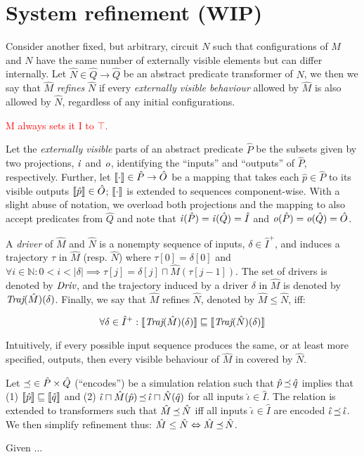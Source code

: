 \section{System refinement (WIP)}

Consider another fixed, but arbitrary, circuit $N$ such that configurations of $M$ and $N$ have the same number of externally visible elements but can differ internally. Let $\hat N \in \hat Q \rightarrow \hat Q$ be an abstract predicate transformer of $N$, we then we say that $\hat M$ \textit{refines} $\hat N$ if every \textit{externally visible behaviour} allowed by $\hat M$ is also allowed by $\hat N$, regardless of any initial configurations.

\textcolor{red}{M always sets it I to $\top$.}

Let the \textit{externally visible} parts of an abstract predicate $\hat P$ be the subsets given by two projections, $\operatorname{\mathit{i}}$ and $\mathit{o}$, identifying the ``inputs'' and ``outputs'' of $\hat P$, respectively. Further, let $\llbracket\cdot\rrbracket \in \hat P \rightarrow \hat O$ be a mapping that takes each $\hat p \in \hat P$ to its visible outputs $\llbracket\hat p\rrbracket \in \hat O$; $\llbracket\cdot\rrbracket$ is extended to sequences component-wise. With a slight abuse of notation, we overload both projections and the mapping to also accept predicates from $\hat Q$ and note that $\operatorname{\mathit{i}}(\hat P) = \operatorname{\mathit{i}}(\hat Q) = \hat I$ and $\mathit{o}(\hat P) = \mathit{o}(\hat Q) = \hat O$.

A \textit{driver} of $\hat M$ and $\hat N$ is a nonempty sequence of inputs, $\delta \in \hat I^{+}$, and induces a trajectory $\tau$ in $\hat M$ (resp. $\hat N$) where $\tau[0] = \delta[0]$ and $\forall i \in \mathbb{N} : 0 < i < | \delta | \implies \tau[j] = \delta[j] \sqcap \hat M(\tau[j-1])$. The set of drivers is denoted by $\operatorname{\textit{Driv}}$, and the trajectory induced by a driver $\delta$ in $\hat M$ is denoted by $\operatorname{\textit{Traj}}(\hat M)(\delta)$. Finally, we say that $\hat M$ refines $\hat N$, denoted by $\hat M \leq \hat N$, iff:

\begin{equation*}
\forall \delta \in \hat I^{+} : \llbracket\operatorname{\textit{Traj}}(\hat M)(\delta)\rrbracket \sqsubseteq \llbracket\operatorname{\textit{Traj}}(\hat N)(\delta)\rrbracket
\end{equation*}

\noindent Intuitively, if every possible input sequence produces the same, or at least more specified, outputs, then every visible behaviour of $\hat M$ in covered by $\hat N$.

Let $\operatorname{\preceq} \in \hat P \times \hat Q$ (``encodes'') be a simulation relation such that $\hat p \operatorname{\preceq} \hat q$ implies that (1) $\llbracket\hat p\rrbracket \sqsubseteq \llbracket\hat q\rrbracket$ and (2) $\hat \iota \sqcap \hat M(\hat p) \operatorname{\preceq} \hat \iota \sqcap \hat N(\hat q)$ for all inputs $\hat \iota \in \hat I$. The relation is extended to transformers such that $\hat M \operatorname{\preceq} \hat N$ iff all inputs $\hat \iota \in \hat I$ are encoded $\hat \iota \operatorname{\preceq} \hat \iota$. We then simplify refinement thus: $\hat M \leq \hat N \Leftrightarrow \hat M \operatorname{\preceq} \hat N$.

\begin{theorem}
Given ...
\end{theorem}

